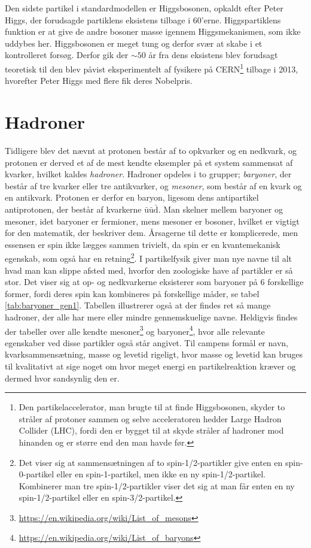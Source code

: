 Den sidste partikel i standardmodellen er Higgsbosonen, opkaldt efter Peter Higgs, der forudsagde partiklens eksistens tilbage i 60'erne. Higgspartiklens funktion er at give de andre bosoner masse igennem Higgsmekanismen, som ikke uddybes her. Higgsbosonen er meget tung og derfor svær at skabe i et kontrolleret forsøg. Derfor gik der $\sim 50$ år fra dens eksistens blev forudsagt teoretisk til den blev påvist eksperimentelt af fysikere på CERN\footnote{Den partikelaccelerator, man brugte til at finde Higgsbosonen, skyder to stråler af protoner sammen og selve acceleratoren hedder Large Hadron Collider (LHC), fordi den er bygget til at skyde stråler af hadroner mod hinanden og er større end den man havde før.} tilbage i 2013, hvorefter Peter Higgs med flere fik deres Nobelpris.

\section{Hadroner}
Tidligere blev det nævnt at protonen består af to opkvarker og en nedkvark, og protonen er derved et af de mest kendte eksempler på et system sammensat af kvarker, hvilket kaldes \textit{hadroner}. Hadroner opdeles i to grupper; \textit{baryoner}, der består af tre kvarker eller tre antikvarker, og \textit{mesoner}, som består af en kvark og en antikvark. Protonen er derfor en baryon, ligesom dens antipartikel antiprotonen, der består af kvarkerne $\bar{\mathrm u}\bar{\mathrm u}\bar{\mathrm d}$. Man skelner mellem baryoner og mesoner, idet baryoner er fermioner, mens mesoner er bosoner, hvilket er vigtigt for den matematik, der beskriver dem. Årsagerne til dette er komplicerede, men essensen er spin ikke lægges sammen trivielt, da spin er en kvantemekanisk egenskab, som også har en retning\footnote{Det viser sig at sammensætningen af to spin-1/2-partikler give enten en spin-0-partikel eller en spin-1-partikel, men ikke en ny spin-1/2-partikel. Kombinerer man tre spin-1/2-partikler viser det sig at man får enten en ny spin-1/2-partikel eller en spin-3/2-partikel.}. I partikelfysik giver man nye navne til alt hvad man kan slippe afsted med, hvorfor den zoologiske have af partikler er så stor. Det viser sig at op- og nedkvarkerne eksisterer som baryoner på 6 forskellige former, fordi deres spin kan kombineres på forskellige måder, se tabel \ref{tab:baryoner_gen1}. Tabellen illustrerer også at der findes ret så mange hadroner, der alle har mere eller mindre gennemskuelige navne. Heldigvis findes der tabeller over alle kendte mesoner\footnote{\url{https://en.wikipedia.org/wiki/List_of_mesons}} og baryoner\footnote{\url{https://en.wikipedia.org/wiki/List_of_baryons}}, hvor alle relevante egenskaber ved disse partikler også står angivet. Til campens formål er navn, kvarksammensætning, masse og levetid rigeligt, hvor masse og levetid kan bruges til kvalitativt at sige noget om hvor meget energi en partikelreaktion kræver og dermed hvor sandsynlig den er.
